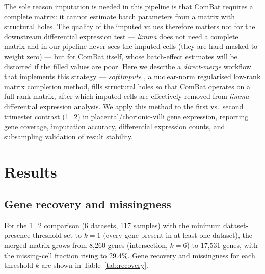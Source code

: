 \documentclass[11pt,a4paper]{article}
\begin{document}
The sole reason imputation is needed in this pipeline is that
ComBat requires a complete matrix: it cannot estimate batch
parameters from a matrix with structural holes. The quality of
the imputed values therefore matters not for the downstream
differential expression test --- \textit{limma} does not need a
complete matrix and in our pipeline never sees the imputed cells
(they are hard-masked to weight zero) --- but for ComBat itself,
whose batch-effect estimates will be distorted if the filled
values are poor. Here we describe a
\emph{direct-merge} workflow that implements this strategy ---
\textit{softImpute} \citep{Mazumder2010,Hastie2015}, a nuclear-norm
regularised low-rank matrix completion method, fills structural
holes so that ComBat operates on a full-rank matrix, after which imputed cells are effectively
removed from \textit{limma} differential expression analysis.
We apply this method to the first vs.~second trimester contrast
(1\_2) in placental/chorionic-villi gene expression, reporting gene coverage,
imputation accuracy, differential expression counts, and
subsampling validation of result stability.

\section{Results}

\subsection{Gene recovery and missingness}
\label{sec:recovery}

For the 1\_2 comparison (6 datasets, 117 samples) with
the minimum dataset-presence threshold set to $k = 1$ (every gene present in at least one dataset), the
merged matrix grows from 8{,}260 genes (intersection, $k = 6$)
to 17{,}531 genes, with the missing-cell fraction rising to
29.4\%. Gene recovery and missingness for each threshold $k$ are
shown in Table~\ref{tab:recovery}.
\end{document}
